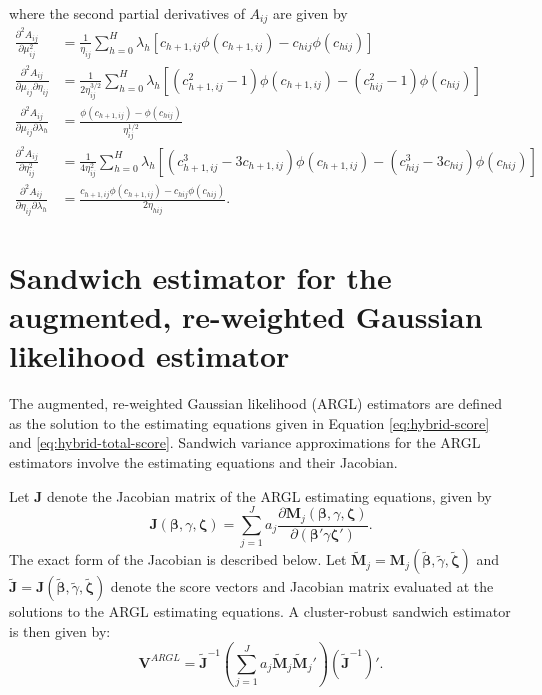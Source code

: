 \documentclass[
  man, donotrepeattitle,floatsintext]{apa7}
\begin{document}
where the second partial derivatives of \(A_{ij}\) are given by
\begin{align}
\frac{\partial^2 A_{ij}}{\partial \mu_{ij}^2} &= \frac{1}{\eta_{ij}} \sum_{h=0}^H \lambda_h \left[c_{h+1,ij} \phi(c_{h+1,ij}) - c_{hij} \phi(c_{hij})\right] \\
\frac{\partial^2 A_{ij}}{\partial \mu_{ij} \partial \eta_{ij}} &= \frac{1}{2 \eta_{ij}^{3/2}} \sum_{h=0}^H \lambda_h \left[(c_{h+1,ij}^2 - 1) \phi(c_{h+1,ij}) - (c_{hij}^2 - 1) \phi(c_{hij})\right] \\
\frac{\partial^2 A_{ij}}{\partial \mu_{ij} \partial \lambda_h} &= \frac{\phi\left(c_{h+1,ij}\right) - \phi\left(c_{hij}\right)}{\eta_{ij}^{1/2}} \\
\frac{\partial^2 A_{ij}}{\partial \eta_{ij}^2} &= \frac{1}{4 \eta_{ij}^2} \sum_{h=0}^H \lambda_h \left[(c_{h+1,ij}^3 - 3 c_{h+1,ij}) \phi(c_{h+1,ij}) - (c_{hij}^3 - 3 c_{hij}) \phi(c_{hij})\right] \\
\frac{\partial^2 A_{ij}}{\partial \eta_{ij} \partial \lambda_h} &= \frac{c_{h+1,ij} \phi\left(c_{h+1,ij}\right) - c_{hij} \phi\left(c_{hij}\right)}{2\eta_{hij}}.
\end{align}

\section{Sandwich estimator for the augmented, re-weighted Gaussian likelihood estimator}\label{ARGL-derivatives}

The augmented, re-weighted Gaussian likelihood (ARGL) estimators are defined as the solution to the estimating equations given in Equation \eqref{eq:hybrid-score} and \eqref{eq:hybrid-total-score}.
Sandwich variance approximations for the ARGL estimators involve the estimating equations and their Jacobian.

Let \(\mathbf{J}\) denote the Jacobian matrix of the ARGL estimating equations, given by
\begin{equation}
\mathbf{J}(\boldsymbol\beta, \gamma, \boldsymbol\zeta) = \sum_{j=1}^J a_j \frac{\partial \mathbf{M}_j(\boldsymbol\beta, \gamma, \boldsymbol\zeta)}{\partial (\boldsymbol\beta' \gamma \boldsymbol\zeta')}.
\end{equation}
The exact form of the Jacobian is described below.
Let \(\mathbf{\tilde{M}}_j = \mathbf{M}_j(\boldsymbol{\tilde\beta}, \tilde\gamma, \boldsymbol{\tilde\zeta})\) and \(\mathbf{\tilde{J}} = \mathbf{J}(\boldsymbol{\tilde\beta}, \tilde\gamma, \boldsymbol{\tilde\zeta})\) denote the score vectors and Jacobian matrix evaluated at the solutions to the ARGL estimating equations.
A cluster-robust sandwich estimator is then given by:
\begin{equation}
\label{eq:hybrid-sandwich-variance}
\mathbf{V}^{ARGL} = \mathbf{\tilde{J}}^{-1}\left(\sum_{j=1}^J a_j \mathbf{\tilde{M}}_j {\mathbf{\tilde{M}}_j}'\right) \left(\mathbf{\tilde{J}}^{-1}\right)'.
\end{equation}
\end{document}
